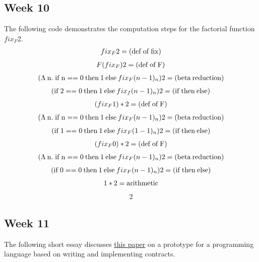 \documentclass{article}
\theoremstyle{theorem}
\theoremstyle{definition}
\theoremstyle{remark}
\begin{document}
\subsection{Week 10}
The following code demonstrates the computation steps for the factorial function $fix_F$2.
\begin{align*}
fix_F 2 = {\rm (def \: of \: fix)}
\end {align*}
\begin {align*}
F (fix_F) 2 = {\rm (def \: of \: F)}
\end {align*}
\begin {align*}
(\Lambda \: {\rm n. \; if \: n} ==0 \: {\rm then} \: 1 \: {\rm else} \: fix_F (n-1)_n) 2 = {\rm (beta \: reduction)}
\end {align*}
\begin {align*}
({\rm if} \: 2==0 \: {\rm then} \: 1 \: {\rm else} \: fix_f(n-1)_n) 2 = {\rm (if \: then \: else)}
\end{align*}
\begin {align*}
(fix_F 1) * 2 = {\rm (def \: of \: F)}
\end{align*}
\begin {align*}
(\Lambda \: {\rm n. \; if \: n} ==0 \: {\rm then} \: 1 \: {\rm else} \: fix_F (n-1)_n) 2 = {\rm (beta \: reduction)}
\end{align*}
\begin {align*}
({\rm if} \: 1==0 \: {\rm then} \: 1 \: {\rm else} \: fix_F (1-1)_n) 2 = {\rm (if \: then \: else)}
\end{align*}
\begin {align*}
(fix_F 0) * 2 = {\rm (def \: of \: F)}
\end{align*}
\begin {align*}
(\Lambda \: {\rm n. \; if \: n} ==0 \: {\rm then} \: 1 \: {\rm else} \: fix_F (n-1)_n) 2 = {\rm (beta \: reduction)}
\end{align*}
\begin {align*}
({\rm if} \: 0==0 \: {\rm then} \: 1 \: {\rm else} \: fix_F (n-1)_n) 2 = {\rm (if \: then \: else)}
\end{align*}
\begin {align*}
1*2 = {\rm arithmetic}
\end{align*}
\begin {align*}
2
\end{align*}

\subsection{Week 11}
The following short essay discusses \href{https://www.cs.tufts.edu/~nr/cs257/archive/simon-peyton-jones/contracts.pdf}{this paper} on a prototype for a programming language based on writing and implementing contracts.
\end{document}
